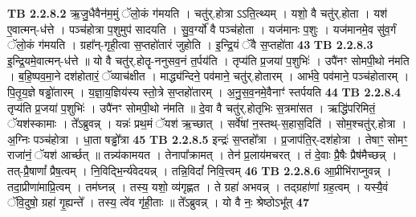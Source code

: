 \documentclass[17pt]{extarticle}
\begin{document}
                                \textbf{ TB 2.2.8.2} \newline
                  ऋ॒जु॒धैवैन॑म॒मुं ॅलो॒कं ग॑मयति । चतु॑र्.होत्रा ऽऽति॒त्थ्यम् । यशो॒ वै चतु॑र्.होता । यश॑ ए॒वात्मन्-ध॑त्ते । पञ्च॑होत्रा प॒शुमुप॑ सादयति । सु॒व॒र्ग्यो॑ वै पञ्च॑होता । यज॑मानः प॒शुः । यज॑मानमे॒व सु॑व॒र्गं ॅलो॒कं ग॑मयति । ग्रहा᳚न्-गृही॒त्वा स॒प्तहो॑तारं जुहोति । इ॒न्द्रि॒यं ॅवै स॒प्तहो॑ता \textbf{ 43} \newline
                  \newline
                                \textbf{ TB 2.2.8.3} \newline
                  इ॒न्द्रि॒यमे॒वात्मन्-ध॑त्ते ॥ यो वै चतु॑र्.होतॄ-ननुसव॒नं त॒र्पय॑ति । तृप्य॑ति प्र॒जया॑ प॒शुभिः॑ । उपै॑नꣳ सोमपी॒थो न॑मति । ब॒हि॒ष्पव॒मा॒ने दश॑होतारं॒ ॅव्याच॑क्षीत । माद्ध्य॑न्दिने॒ पव॑माने॒ चतु॑र्.होतारम् । आर्भ॑वे॒ पव॑माने॒ पञ्च॑होतारम् । पि॒तृ॒य॒ज्ञे षड्ढो॑तारम् । य॒ज्ञा॒य॒ज्ञिय॑स्य स्तो॒त्रे स॒प्तहो॑तारम् । अ॒नु॒स॒व॒नमे॒वैनाꣳ॑ स्तर्पयति \textbf{ 44} \newline
                  \newline
                                \textbf{ TB 2.2.8.4} \newline
                  तृप्य॑ति प्र॒जया॑ प॒शुभिः॑ । उपै॑नꣳ सोमपी॒थो न॑मति ॥ दे॒वा वै चतु॑र्.होतृभिः स॒त्रमा॑सत । ऋद्धि॑परिमितं॒ ॅयश॑स्कामाः । ते᳚ऽब्रुवन्न् । यन्नः॑ प्रथ॒मं ॅयश॑ ऋ॒च्छात् । सर्वे॑षां न॒स्तथ्-स॒हास॒दिति॑ । सोम॒श्चतु॑र्.होत्रा । अ॒ग्निः पञ्च॑होत्रा । धा॒ता षड्ढो᳚त्रा \textbf{ 45} \newline
                  \newline
                                \textbf{ TB 2.2.8.5} \newline
                  इन्द्रः॑ स॒प्तहो᳚त्रा । प्र॒जाप॑ति॒र्-दश॑होत्रा । तेषाꣳ॒॒ सोमꣳ॒॒ राजा॑नं॒ ॅयश॑ आर्च्छत् ॥ तन्न्य॑कामयत । तेनापा᳚क्रामत् । तेन॑ प्र॒लाय॑मचरत् । तं दे॒वाः प्रै॒षैः प्रैष॑मैच्छन्न् । तत्-प्रै॒षाणां᳚ प्रैष॒त्वम् । नि॒विद्भि॒र्न्य॑वेदयन्न् । तन्नि॒विदां᳚ निवि॒त्त्वम् \textbf{ 46} \newline
                  \newline
                                \textbf{ TB 2.2.8.6} \newline
                  आ॒प्रीभि॑राप्नुवन्न् । तदा॒प्रीणा॑माप्रि॒त्वम् । तम॑घ्नन्न् । तस्य॒ यशो॒ व्य॑गृह्णत । ते ग्रहा॑ अभवन्न् । तद्ग्रहा॑णां ग्रह॒त्वम् । यस्यै॒वं ॅवि॒दुषो॒ ग्रहा॑ गृ॒ह्यन्ते᳚ । तस्य॒ त्वे॑व गृ॑ही॒ताः ॥ ते᳚ऽब्रुवन्न् । यो वै नः॒ श्रेष्ठोऽभू᳚त् \textbf{ 47} \newline
                  \newline
\end{document}

